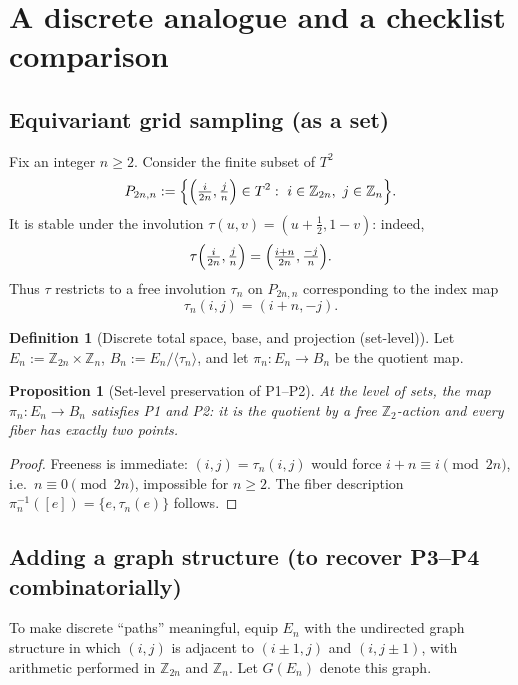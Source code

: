\documentclass[11pt,a4paper]{article}
\newtheorem{proposition}[theorem]{Proposition}
\theoremstyle{definition}
\newtheorem{definition}[theorem]{Definition}
\theoremstyle{remark}
\begin{document}
\section{A discrete analogue and a checklist comparison}
\label{sec:discrete-analogue}

\subsection{Equivariant grid sampling (as a set)}
\label{sec:grid-sampling}

Fix an integer \(n\ge 2\). Consider the finite subset of \(T^2\)
\[
P_{2n,n}:=\Bigl\{\Bigl(\tfrac{i}{2n},\tfrac{j}{n}\Bigr)\in T^2:\ i\in\mathbb{Z}_{2n},\ j\in\mathbb{Z}_n\Bigr\}.
\]
It is stable under the involution \(\tau(u,v)=(u+\tfrac12,1-v)\): indeed,
\[
\tau\Bigl(\tfrac{i}{2n},\tfrac{j}{n}\Bigr)=\Bigl(\tfrac{i+n}{2n},\tfrac{-j}{n}\Bigr).
\]
Thus \(\tau\) restricts to a free involution \(\tau_n\) on \(P_{2n,n}\) corresponding to the index map
\[
\tau_n(i,j)=(i+n,-j).
\]

\begin{definition}[Discrete total space, base, and projection (set-level)]
\label{def:discrete-set-map}
Let \(E_n:=\mathbb{Z}_{2n}\times\mathbb{Z}_n\), \(B_n:=E_n/\langle\tau_n\rangle\), and let \(\pi_n:E_n\to B_n\) be the quotient map.
\end{definition}

\begin{proposition}[Set-level preservation of P1--P2]
\label{prop:set-level}
At the level of sets, the map \(\pi_n:E_n\to B_n\) satisfies P1 and P2: it is the quotient by a free \(\mathbb{Z}_2\)-action and every fiber has exactly two points.
\end{proposition}

\begin{proof}
Freeness is immediate: \((i,j)=\tau_n(i,j)\) would force \(i+n\equiv i\pmod{2n}\), i.e.\ \(n\equiv 0\pmod{2n}\), impossible for \(n\ge 2\). The fiber description \( \pi_n^{-1}([e])=\{e,\tau_n(e)\}\) follows.
\end{proof}

\subsection{Adding a graph structure (to recover P3--P4 combinatorially)}
\label{sec:graph-structure}

To make discrete ``paths'' meaningful, equip \(E_n\) with the undirected graph structure in which \((i,j)\) is adjacent to \((i\pm1,j)\) and \((i,j\pm1)\), with arithmetic performed in \(\mathbb{Z}_{2n}\) and \(\mathbb{Z}_n\). Let \(G(E_n)\) denote this graph.
\end{document}
